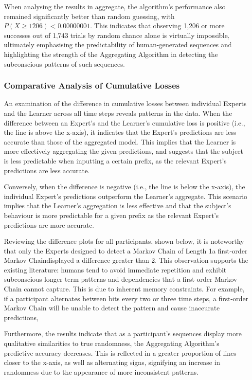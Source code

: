 When analysing the results in aggregate, the algorithm's performance also remained significantly better than random guessing, with $P(X \geq 1206) < 0.00000001$. This indicates that observing 1,206 or more successes out of 1,743 trials by random chance alone is virtually impossible, ultimately emphasising the predictability of human-generated sequences and highlighting the strength of the Aggregating Algorithm in detecting the subconscious patterns of such sequences.

\subsubsection{Comparative Analysis of Cumulative Losses}
An examination of the difference in cumulative losses between individual Experts and the Learner across all time steps reveals patterns in the data. When the difference between an Expert's and the Learner's cumulative loss is positive (i.e., the line is above the x-axis), it indicates that the Expert's predictions are less accurate than those of the aggregated model. This implies that the Learner is more effectively aggregating the given predictions, and suggests that the subject is less predictable when inputting a certain prefix, as the relevant Expert's predictions are less accurate.

Conversely, when the difference is negative (i.e., the line is below the x-axis), the individual Expert's predictions outperform the Learner's aggregate. This scenario implies that the Learner's aggregation is less effective and that the subject's behaviour is more predictable for a given prefix as the relevant Expert's predictions are more accurate.

Reviewing the difference plots for all participants, shown below, it is noteworthy that only the Experts designed to detect a Markov Chain of Length 1\textemdash{}a first-order Markov Chain\textemdash{}displayed a difference greater than 2. This observation supports the existing literature: humans tend to avoid immediate repetition and exhibit subconscious longer-term patterns and dependencies that a first-order Markov Chain cannot capture. This is due to inherent memory constraints. For example, if a participant alternates between bits every two or three time steps, a first-order Markov Chain will be unable to detect the pattern and cause inaccurate predictions,

Furthermore, the results indicate that as a participant's sequences display more qualitative similarities to true randomness, the Aggregating Algorithm's predictive accuracy decreases. This is reflected in a greater proportion of lines closer to the x-axis, as well as alternating signs, signifying an increase in randomness due to the appearance of more inconsistent patterns.

